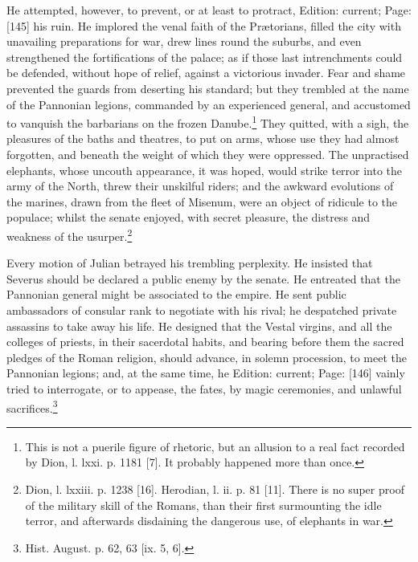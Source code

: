 He attempted, however, to prevent, or at least to protract, Edition: current; Page: [145] his ruin. He implored the venal faith of the Prætorians, filled the city with unavailing preparations for war, drew lines round the suburbs, and even strengthened the fortifications of the palace; as if those last intrenchments could be defended, without hope of relief, against a victorious invader. Fear and shame prevented the guards from deserting his standard; but they trembled at the name of the Pannonian legions, commanded by an experienced general, and accustomed to vanquish the barbarians on the frozen Danube.\footnote{This is not a puerile figure of rhetoric, but an allusion to a real fact recorded by Dion, l. lxxi. p. 1181 [7]. It probably happened more than once.} They quitted, with a sigh, the pleasures of the baths and theatres, to put on arms, whose use they had almost forgotten, and beneath the weight of which they were oppressed. The unpractised elephants, whose uncouth appearance, it was hoped, would strike terror into the army of the North, threw their unskilful riders; and the awkward evolutions of the marines, drawn from the fleet of Misenum, were an object of ridicule to the populace; whilst the senate enjoyed, with secret pleasure, the distress and weakness of the usurper.\footnote{Dion, l. lxxiii. p. 1238 [16]. Herodian, l. ii. p. 81 [11]. There is no super proof of the military skill of the Romans, than their first surmounting the idle terror, and afterwards disdaining the dangerous use, of elephants in war.}

Every motion of Julian betrayed his trembling perplexity. He insisted that Severus should be declared a public enemy by the senate. He entreated that the Pannonian general might be associated to the empire. He sent public ambassadors of consular rank to negotiate with his rival; he despatched private assassins to take away his life. He designed that the Vestal virgins, and all the colleges of priests, in their sacerdotal habits, and bearing before them the sacred pledges of the Roman religion, should advance, in solemn procession, to meet the Pannonian legions; and, at the same time, he Edition: current; Page: [146] vainly tried to interrogate, or to appease, the fates, by magic ceremonies, and unlawful sacrifices.\footnote{Hist. August. p. 62, 63 [ix. 5, 6].}

